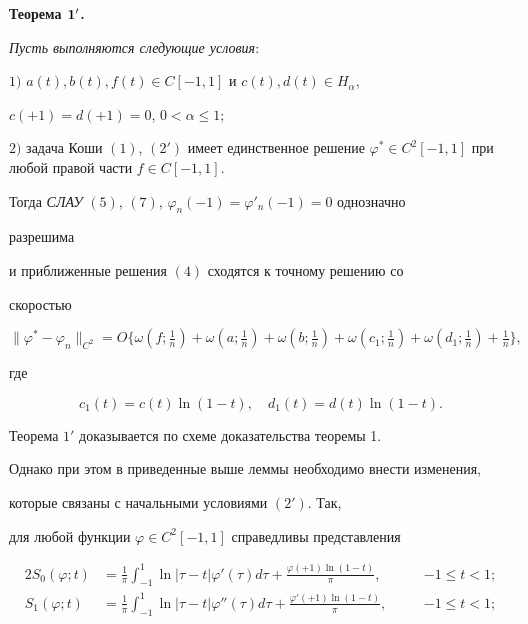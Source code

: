 {\bf Теорема $\bold 1'$.} {\it Пусть выполняются следующие условия\/${:}$


 


$1)$ $a(t),b(t),f(t)\in C[-1,1]$ и $c(t),d(t)\in H_\alpha$, 


$c(+1)=d(+1)=0$, $0<\alpha\le1;$ 


 


$2)$ задача Коши $(1)$, $(2')$ имеет единственное решение $\varphi^*\in 


C^2[-1,1]$ при любой правой части $f\in C[-1,1]$. 


 


Тогда {\em СЛАУ} $(5)$, $(7)$, $\varphi_n(-1)=\varphi'_n(-1)=0$ однозначно 


разрешима 


и приближенные решения $(4)$ сходятся к точному решению со 


скоростью 


$$ 


\|\varphi^*-\varphi_n\|_{C^2}=O\{\omega(f;\tfrac{1}{n})+\omega 


(a;\tfrac{1}{n})+\omega(b;\tfrac{1}{n})+\omega 


(c_1;\tfrac{1}{n})+\omega(d_1;\tfrac{1}{n})+\tfrac{1}{n}\}, 


$$ 


где 


$$ 


c_1(t)=c(t)\ln(1-t),\quad d_1(t)=d(t)\ln(1-t). 


$$ 


} 


 


 


Теорема $1'$ доказывается по схеме доказательства теоремы 1. 


Однако при этом в приведенные выше леммы необходимо внести изменения, 


которые связаны с начальными условиями $(2')$. Так, 


для любой функции $\varphi\in C^2[-1,1]$ справедливы представления 


\begin{alignat*}{2} 


S_0(\varphi;t)&=\frac{1}{\pi}\int^1_{-1}\ln|\tau-t| 


\varphi'(\tau)d\tau+ 


\frac{\varphi(+1)\ln(1-t)}{\pi}, &\quad &-1\le t<1; \\ 


% 


S_1(\varphi;t)&=\frac{1}{\pi}\int^1_{-1}\ln|\tau-t| 


\varphi''(\tau)d\tau+\frac{\varphi'(+1)\ln(1-t)}{\pi},&\quad 


&-1\le t<1; 


\end{alignat*} 


